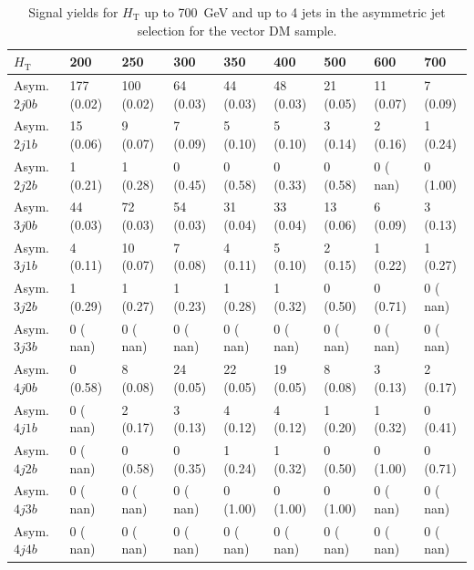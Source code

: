\begin{table}[h]
\begin{tabular}{lllllllll}
\hline \hline
$H_\textrm{T}$                 &     200 &            250 &             300&             350&             400&             500&             600&             700  \\\hline\hline
Asym. $2j 0b$&     177 (0.02)&	  100 (0.02)&	   64 (0.03)&	   44 (0.03)&	   48 (0.03)&	   21 (0.05)&	   11 (0.07)&	    7 (0.09) \\\hline
Asym. $2j 1b$&      15 (0.06)&	    9 (0.07)&	    7 (0.09)&	    5 (0.10)&	    5 (0.10)&	    3 (0.14)&	    2 (0.16)&	    1 (0.24) \\\hline
Asym. $2j 2b$&       1 (0.21)&	    1 (0.28)&	    0 (0.45)&	    0 (0.58)&	    0 (0.33)&	    0 (0.58)&	    0 ( nan)&	    0 (1.00) \\\hline
Asym. $3j 0b$&      44 (0.03)&	   72 (0.03)&	   54 (0.03)&	   31 (0.04)&	   33 (0.04)&	   13 (0.06)&	    6 (0.09)&	    3 (0.13) \\\hline
Asym. $3j 1b$&       4 (0.11)&	   10 (0.07)&	    7 (0.08)&	    4 (0.11)&	    5 (0.10)&	    2 (0.15)&	    1 (0.22)&	    1 (0.27) \\\hline
Asym. $3j 2b$&       1 (0.29)&	    1 (0.27)&	    1 (0.23)&	    1 (0.28)&	    1 (0.32)&	    0 (0.50)&	    0 (0.71)&	    0 ( nan) \\\hline
Asym. $3j 3b$&       0 ( nan)&	    0 ( nan)&	    0 ( nan)&	    0 ( nan)&	    0 ( nan)&	    0 ( nan)&	    0 ( nan)&	    0 ( nan) \\\hline
Asym. $4j 0b$&       0 (0.58)&	    8 (0.08)&	   24 (0.05)&	   22 (0.05)&	   19 (0.05)&	    8 (0.08)&	    3 (0.13)&	    2 (0.17) \\\hline
Asym. $4j 1b$&       0 ( nan)&	    2 (0.17)&	    3 (0.13)&	    4 (0.12)&	    4 (0.12)&	    1 (0.20)&	    1 (0.32)&	    0 (0.41) \\\hline
Asym. $4j 2b$&       0 ( nan)&	    0 (0.58)&	    0 (0.35)&	    1 (0.24)&	    1 (0.32)&	    0 (0.50)&	    0 (1.00)&	    0 (0.71) \\\hline
Asym. $4j 3b$&       0 ( nan)&	    0 ( nan)&	    0 ( nan)&	    0 (1.00)&	    0 (1.00)&	    0 (1.00)&	    0 ( nan)&	    0 ( nan) \\\hline
Asym. $4j 4b$&       0 ( nan)&	    0 ( nan)&	    0 ( nan)&	    0 ( nan)&	    0 ( nan)&	    0 ( nan)&	    0 ( nan)&	    0 ( nan) \\\hline
\hline
\end{tabular}
\caption{Signal yields for $H_\textrm{T}$ up to 700~GeV and up to 4 jets in the asymmetric jet selection for the vector DM sample.}
\label{tab:sig_yields_VDM_asym}
\end{table}


